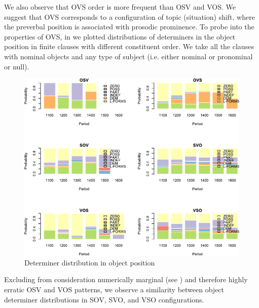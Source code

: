 \documentclass[output=paper,modfonts,nonflat]{langsci/langscibook}
\begin{document}
We also observe that OVS order is more frequent than OSV and VOS. We suggest that OVS corresponds to a configuration of topic (situation) shift, where the preverbal position is associated with prosodic prominence. To probe into the properties of OVS, in  we plotted distributions of determiners in the object position in finite clauses with different constituent order. We take all the clauses with nominal objects and any type of subject (i.e. either nominal or pronominal or null).

\begin{figure}
\includegraphics[width=.75\textwidth]{figures/determinersOrders.pdf}
\caption{Determiner distribution in object position}\label{figure:determinersOrders}
\end{figure}


Excluding from consideration numerically marginal (see ) and therefore highly erratic OSV and VOS patterns, we observe a similarity between object determiner distributions in SOV, SVO, and VSO configurations.

\end{document}
